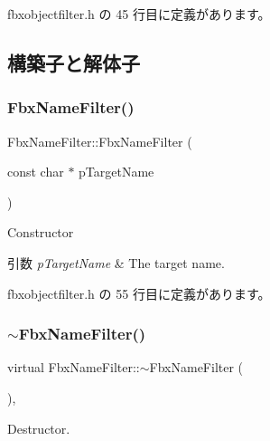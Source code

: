  fbxobjectfilter.\+h の 45 行目に定義があります。



\subsection{構築子と解体子}
\mbox{\label{class_fbx_name_filter_aa617f8a9e025839e93cf0fda0ec6cda4}} 
\subsubsection{\texorpdfstring{Fbx\+Name\+Filter()}{FbxNameFilter()}}
{\footnotesize\ttfamily Fbx\+Name\+Filter\+::\+Fbx\+Name\+Filter (\begin{DoxyParamCaption}\item[{const char $\ast$}]{p\+Target\+Name }\end{DoxyParamCaption})\hspace{0.3cm}{\ttfamily [inline]}}

Constructor 
\begin{DoxyParams}{引数}
{\em p\+Target\+Name} & The target name. \\
\hline
\end{DoxyParams}


 fbxobjectfilter.\+h の 55 行目に定義があります。

\mbox{\label{class_fbx_name_filter_a44742170200731e2943525ccad88c48e}} 
\subsubsection{\texorpdfstring{$\sim$\+Fbx\+Name\+Filter()}{~FbxNameFilter()}}
{\footnotesize\ttfamily virtual Fbx\+Name\+Filter\+::$\sim$\+Fbx\+Name\+Filter (\begin{DoxyParamCaption}{ }\end{DoxyParamCaption})\hspace{0.3cm}{\ttfamily [inline]}, {\ttfamily [virtual]}}



Destructor. 



